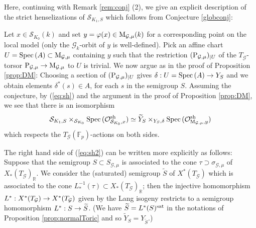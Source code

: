 \documentclass[reqno, 10pt]{amsart}
\makeatletter
\newcommand{\BF}{\ensuremath{\mathbb {F}}\xspace}
\newcommand{\BR}{\ensuremath{\mathbb {R}}\xspace}
\newcommand{\CG}{\ensuremath{\mathcal {G}}\xspace}
\newcommand{\CO}{\ensuremath{\mathcal {O}}\xspace}
\newcommand{\CS}{\ensuremath{\mathcal {S}}\xspace}
\DeclareMathOperator{\Spec}{Spec\,}
\newcommand{\wt}{\widetilde}
\theoremstyle{definition}
\numberwithin{equation}{subsection}
\numberwithin{subsubsection}{subsection}
\renewcommand{\to}{%
   \ifbool{@display}{\longrightarrow}{\rightarrow}%
   }
\newcommand{\Mloc}{{\rm M}}
\makeatother
\begin{document}
Here, continuing with Remark \ref{rem:conj} (2), we give an explicit description of the strict henselizations  of $\CS_{K_1, S}$ which follows from Conjecture \ref{globconj}:  
 
Let $x\in \CS_{K_0}(k)$ and set $y=\varphi(x)\in \Mloc_{\CG,\mu}(k)$
 for a corresponding point on the local model (only the $\CG_k$-orbit of $y$ is well-defined). Pick an affine chart $U=\Spec(A)\subset \Mloc_{\CG,\mu}$ containing $y$ such that the restriction $({\rm P}_{\CG,\mu})_{|U}$ of the $T_\CG$-torsor ${\rm P}_{\CG,\mu}\to \Mloc_{\CG,\mu}$ to $U$ is trivial. We now argue as in the proof of Proposition \ref{prop:DM}: Choosing a section of $({\rm P}_{\CG,\mu})_{|U}$ gives $\delta: U=\Spec(A)\to Y_S$ and we obtain elements $\delta^*(s)\in A$, for each  $s$ in the semigroup $S$.  Assuming the conjecture, by (\ref{eq:sh})  and the argument in the proof of Proposition \ref{prop:DM}, we see that there is an isomorphism
 \begin{equation}\label{eq:sh2}
 \CS_{K_1, S}\times_{\CS_{K_0}}\Spec(\CO^{\rm sh}_{\CS_{K_0}, x})\simeq  \wt Y_S\times_{Y_S,\delta}\Spec(\CO^{\rm sh}_{\Mloc_{\CG,\mu}, y})
 \end{equation}
 which respects the $T_\CG(\BF_p)$-actions on both sides.  
 
 The right hand side of (\ref{eq:sh2}) can be written   more explicitly as follows: Suppose that the semigroup $S\subset S_{\CG,\mu}$ is associated to the cone $\tau\supset \sigma_{\CG,\mu}$ of $X_*(T_\CG)_\BR$. We consider the (saturated) semigroup $\wt S$ of $X^*(T_\CG)$ which is associated to the cone $L_*^{-1}(\tau)\subset X_*(T_\CG)_\BR$; then the injective homomorphism $L^*: X^*(T_\CG)\to X^*(T_\CG)$ given by the Lang isogeny restricts to a semigroup homomorphism $L^*: S\to \wt S$. (We have $\wt S=L^*(S)^{\rm sat}$ in the notations of Proposition \ref{prop:normalToric} and so $\wt Y_S=Y_{\wt S}$.)
 
\end{document}

